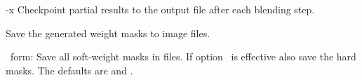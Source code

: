 \begin{codelist}


\ifenblend
    \label{opt:x}%
  \item[-x]
    Checkpoint partial results to the output file after each blending step.
\fi


\ifenfuse
    \label{opt:save-masks}%
  \item[\itempar{--save-masks~\textrm{(\oldstylefirst~form)}
      \\ --save-masks=\metavar{SOFT-MASK-TEMPLATE}~\textrm{(\oldstylesecond~form)}
      \\ --save-masks=\metavar{SOFT-MASK-TEMPLATE}:\feasiblebreak
      \metavar{HARD-MASK-TEMPLATE}~\textrm{(\oldstylethird~form)}}]\itemend
    Save the generated weight masks to image files.

    \begin{sloppypar}
      \oldstylefirst~form: Save all soft-weight masks in files.  If
      option~ is effective also save the hard
      masks.  The defaults are  and
      .


\end{sloppypar}
\end{codelist}
